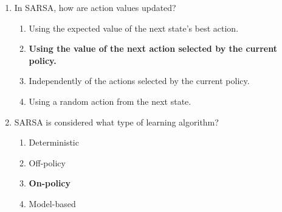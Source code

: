 \documentclass{report}
\numberwithin{equation}{section}
\begin{document}
\begin{enumerate}
\item In SARSA, how are action values updated?
\begin{enumerate}[label=\alph*.]
    \item Using the expected value of the next state's best action.
    \item \textbf{Using the value of the next action selected by the current policy.}
    \item Independently of the actions selected by the current policy.
    \item Using a random action from the next state.
\end{enumerate}

\item SARSA is considered what type of learning algorithm?
\begin{enumerate}[label=\alph*.]
    \item Deterministic
    \item Off-policy
    \item \textbf{On-policy}
    \item Model-based
\end{enumerate}
    
    
    


\end{enumerate}
\end{document}
